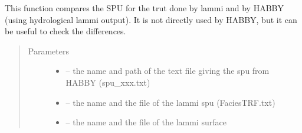\documentclass[letterpaper,10pt,english]{sphinxmanual}
\begin{document}
\begin{fulllineitems}
\label{\detokenize{index:src.lammi.compare_lammi}}
This function compares the SPU for the trut done by lammi and by HABBY (using hydrological lammi output). It is
not directly used by HABBY, but it can be useful to check the differences.
\begin{quote}\begin{description}
\item[{Parameters}] \leavevmode\begin{itemize}
\item {} 
 -- the name and path of the text file giving the spu from HABBY (spu\_xxx.txt)

\item {} 
 -- the name and the file of the lammi spu (FaciesTRF.txt)

\item {} 
 -- the name and the file of the lammi surface

\end{itemize}

\end{description}\end{quote}

\end{fulllineitems}

\end{document}
